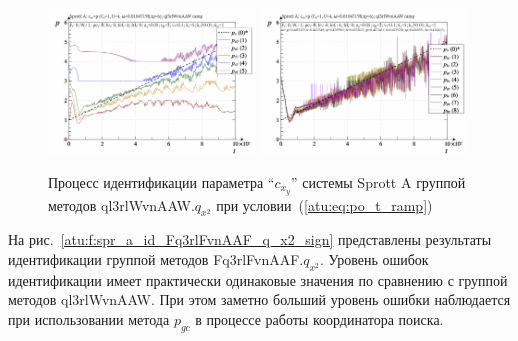 \begin{figure}[htb!]
  \centerline{
    \includegraphics[width=0.49\textwidth]{p/cha/spr_a/ql3rlWvnAAW_x2/sprott_a_id-p_t_pi_ql3rlWvnAAW_ramp.png}
    \hfill
    \includegraphics[width=0.49\textwidth]{p/cha/spr_a/ql3rlWvnAAW_x2/sprott_a_id-p_t_p_ql3rlWvnAAW_ramp.png}
  }
  \caption{Процесс идентификации параметра ``$c_{x_y}$'' системы Sprott A группой методов ql3rlWvnAAW.$q_{x^2}$ при условии~(\ref{atu:eq:po_t_ramp})}
  \label{atu:f:spr_a_id_ql3rlWvnAAW_q_x2_ramp}
\end{figure}

На рис.~\ref{atu:f:spr_a_id_Fq3rlFvnAAF_q_x2_sign} представлены результаты идентификации
группой методов Fq3rlFvnAAF.$q_{x^2}$.
Уровень ошибок идентификации имеет практически одинаковые значения
по сравнению с группой методов ql3rlWvnAAW. При этом
заметно больший уровень ошибки наблюдается при использовании
метода $p_{gc}$ в процессе работы координатора поиска.


